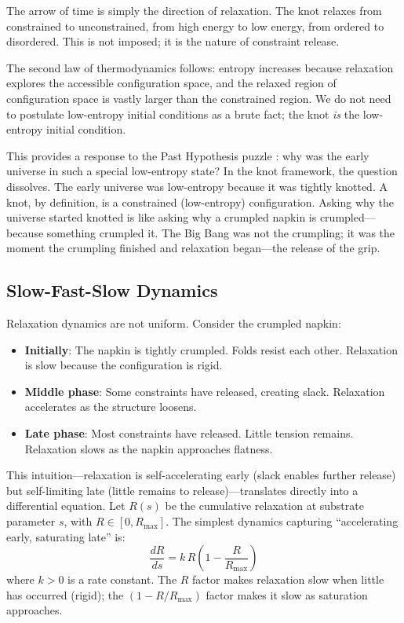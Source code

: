 \documentclass[11pt,a4paper]{article}
\begin{document}
The arrow of time is simply the direction of relaxation. The knot relaxes from constrained to unconstrained, from high energy to low energy, from ordered to disordered. This is not imposed; it is the nature of constraint release.

The second law of thermodynamics follows: entropy increases because relaxation explores the accessible configuration space, and the relaxed region of configuration space is vastly larger than the constrained region. We do not need to postulate low-entropy initial conditions as a brute fact; the knot \emph{is} the low-entropy initial condition.

This provides a response to the Past Hypothesis puzzle \cite{albert2000, carroll2010}: why was the early universe in such a special low-entropy state? In the knot framework, the question dissolves. The early universe was low-entropy because it was tightly knotted. A knot, by definition, is a constrained (low-entropy) configuration. Asking why the universe started knotted is like asking why a crumpled napkin is crumpled---because something crumpled it. The Big Bang was not the crumpling; it was the moment the crumpling finished and relaxation began---the release of the grip.

\subsection{Slow-Fast-Slow Dynamics}

Relaxation dynamics are not uniform. Consider the crumpled napkin:
\begin{itemize}
    \item \textbf{Initially}: The napkin is tightly crumpled. Folds resist each other. Relaxation is slow because the configuration is rigid.
    \item \textbf{Middle phase}: Some constraints have released, creating slack. Relaxation accelerates as the structure loosens.
    \item \textbf{Late phase}: Most constraints have released. Little tension remains. Relaxation slows as the napkin approaches flatness.
\end{itemize}

This intuition---relaxation is self-accelerating early (slack enables further release) but self-limiting late (little remains to release)---translates directly into a differential equation. Let $R(s)$ be the cumulative relaxation at substrate parameter $s$, with $R \in [0, R_{\max}]$. The simplest dynamics capturing ``accelerating early, saturating late'' is:
\begin{equation}
    \frac{dR}{ds} = k \, R \left(1 - \frac{R}{R_{\max}}\right)
\end{equation}
where $k > 0$ is a rate constant. The $R$ factor makes relaxation slow when little has occurred (rigid); the $(1 - R/R_{\max})$ factor makes it slow as saturation approaches.
\end{document}
